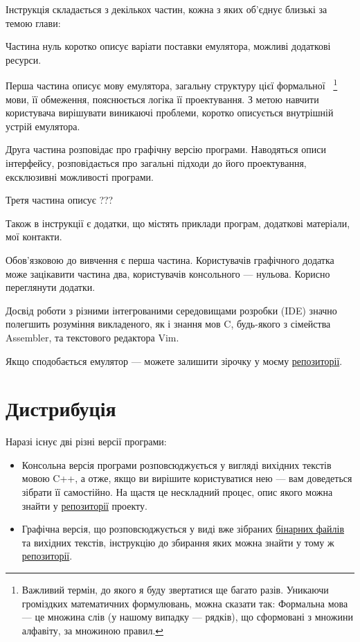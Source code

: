 \documentclass[oneside,final,14pt]{extreport}
\begin{document}
\bigskip

Інструкція складається з декількох частин, кожна з яких об'єднує близькі за темою глави:

Частина нуль коротко описує варіати поставки емулятора, можливі додаткові ресурси.

Перша частина описує мову емулятора, загальну структуру цієї 
формальної~
\footnote{Важливий термін, до якого я буду звертатися ще багато разів. Уникаючи громіздких математичних формулювань, можна сказати так: Формальна мова --- це множина слів (у нашому випадку --- рядків), що сформовані з множини алфавіту, за множиною правил.}
мови, її обмеження, пояснюється логіка її проектування. З метою навчити користувача вирішувати виникаючі проблеми, коротко описується внутрішній устрій емулятора.

Друга частина розповідає про графічну версію програми. Наводяться описи інтерфейсу, розповідається про загальні підходи до його проектування, ексклюзивні можливості програми. 

Третя частина описує ??? %

Також в інструкції є додатки, що містять приклади програм, додаткові матеріали, мої контакти.

\bigskip

\bigskip 

Обов'язковою до вивчення є перша частина. Користувачів графічного додатка може зацікавити частина два, користувачів консольного --- нульова. Корисно переглянути додатки.

Досвід роботи з різними інтегрованими середовищами розробки (IDE) значно полегшить розуміння викладеного, як і знання мов C, будь-якого з сімейства Assembler, та текстового редактора Vim.

\bigskip

\bigskip

Якщо сподобається емулятор --- можете залишити зірочку у моєму  \href{https://github.com/Kaifolog/TME}{репозиторії}.

\setcounter{chapter}{-1}

\chapter{Дистрибуція}

 
\vspace{0.4 cm}
 
Наразі існує дві різні версії програми: 
\begin{itemize}
	\item Консольна версія програми розповсюджується у вигляді вихідних текстів мовою C++, а отже, якщо ви вирішите користуватися нею --- вам доведеться зібрати її самостійно. На щастя це нескладний процес, опис якого можна знайти у \href{https://github.com/Kaifolog/TME}{репозиторії} проекту.
	\item Графічна версія, що розповсюджується у виді вже зібраних \href{https://kaifolog.github.io/TME-website/}{бінарних файлів} та вихідних текстів, інструкцію до збирання яких можна знайти у тому ж \href{https://github.com/Kaifolog/TME}{репозиторії}. 
\end{itemize}
\end{document}
